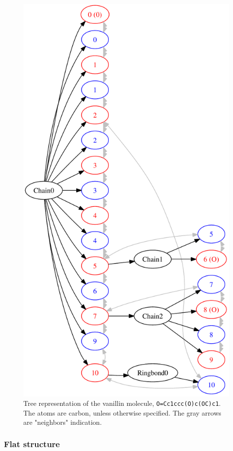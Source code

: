 \documentclass[a4paper, 11pt]{article}
\begin{document}
\begin{figure}
    \begin{center}
        \includegraphics[width=0.8\columnwidth]{images/Vanillin-tree.pdf}
    \end{center}
    \caption[Tree representation of the vanillin molecule]{\label{fig:vanillin-tree} Tree representation of the vanillin molecule, {\tt O=Cc1ccc(O)c(OC)c1}. The atoms are carbon, unless otherwise specified. The gray arrows are "neighbors" indication.}
\end{figure}

\subsubsection{Flat structure}
\end{document}
